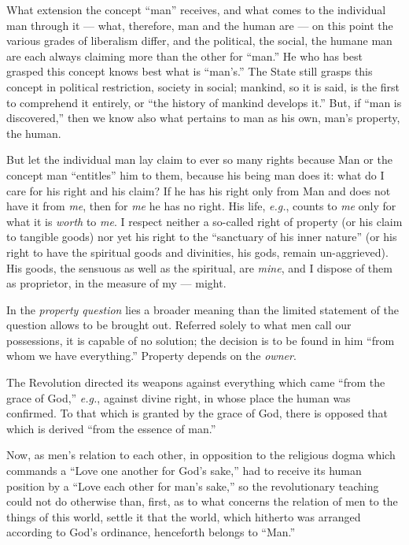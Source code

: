 What extension the concept ``man'' receives, and what comes to the 
individual man through it --- what, therefore, man and the human are --- on this 
point the various grades of liberalism differ, and the political, the social, 
the humane man are each always claiming more than the other for ``man.'' He 
who has best grasped this concept knows best what is ``man's.'' The State 
still grasps this concept in political restriction, society in social; 
mankind, so it is said, is the first to comprehend it entirely, or ``the 
history of mankind develops it.'' But, if ``man is discovered,'' then we 
know also what pertains to man as his own, man's property, the human.

But let the individual man lay claim to ever so many rights because Man or the 
concept man ``entitles'' him to them, because his being man does it: what do 
I care for his right and his claim? If he has his right only from Man and does 
not have it from \textit{me}, then for \textit{me} he has no right. His life, 
\textit{e.g.}, counts to \textit{me} only for what it is \textit{worth} to 
\textit{me}. I respect neither a so-called right of property (or his claim to 
tangible goods) nor yet his right to the ``sanctuary of his inner nature'' 
(or his right to have the spiritual goods and divinities, his gods, remain 
un-aggrieved). His goods, the sensuous as well as the spiritual, are 
\textit{mine}, and I dispose of them as proprietor, in the measure of my --- might.

In the \textit{property question} lies a broader meaning than the limited 
statement of the question allows to be brought out. Referred solely to what 
men call our possessions, it is capable of no solution; the decision is to be 
found in him ``from whom we have everything.'' Property depends on the 
\textit{owner}.

The Revolution directed its weapons against everything which came ``from the 
grace of God,'' \textit{e.g.}, against divine right, in whose place the 
human was confirmed. To that which is granted by the grace of God, there is 
opposed that which is derived ``from the essence of man.''

Now, as men's relation to each other, in opposition to the religious dogma 
which commands a ``Love one another for God's sake,'' had to receive its 
human position by a ``Love each other for man's sake,'' so the revolutionary 
teaching could not do otherwise than, first, as to what concerns the relation 
of men to the things of this world, settle it that the world, which hitherto 
was arranged according to God's ordinance, henceforth belongs to ``Man.''

